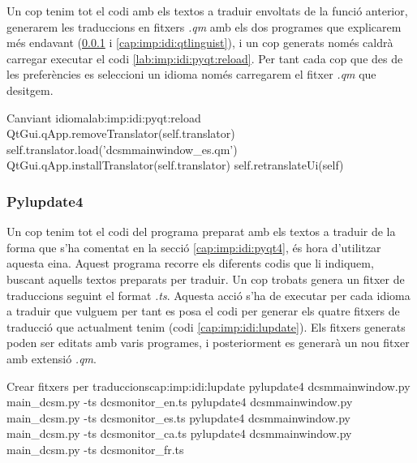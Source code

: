 Un cop tenim tot el codi amb els textos a traduir envoltats de la funció anterior, generarem les traduccions en fitxers \emph{.qm} amb els dos programes que explicarem més endavant (\Pylupdate \ref{cap:imp:idi:pylupdate4} i \Qtlinguist \ref{cap:imp:idi:qtlinguist}), i un cop generats només caldrà carregar executar el codi \ref{lab:imp:idi:pyqt:reload}.
Per tant cada cop que des de les preferències es seleccioni un idioma només carregarem el fitxer \emph{.qm} que desitgem.

\begin{code_python}{Canviant idioma}{lab:imp:idi:pyqt:reload}
QtGui.qApp.removeTranslator(self.translator)
self.translator.load('dcsmmainwindow_es.qm')
QtGui.qApp.installTranslator(self.translator)
self.retranslateUi(self)
\end{code_python}

\subsubsection{Pylupdate4}\label{cap:imp:idi:pylupdate4}

Un cop tenim tot el codi del programa \DCSMonitor preparat amb els textos a traduir de la forma que s'ha comentat en la secció \ref{cap:imp:idi:pyqt4}, és hora d'utilitzar aquesta eina.
Aquest programa recorre els diferents codis que li indiquem, buscant aquells textos preparats per traduir. Un cop trobats genera un fitxer de traduccions seguint el format \emph{.ts}.
Aquesta acció s'ha de executar per cada idioma a traduir que vulguem per tant es posa el codi per generar els quatre fitxers de traducció que actualment tenim (codi \ref{cap:imp:idi:lupdate}).
Els fitxers generats poden ser editats amb varis programes, i posteriorment es generarà un nou fitxer amb extensió \emph{.qm}.

\begin{code_bash}{Crear fitxers per traduccions}{cap:imp:idi:lupdate}
pylupdate4 dcsmmainwindow.py main_dcsm.py -ts dcsmonitor_en.ts
pylupdate4 dcsmmainwindow.py main_dcsm.py -ts dcsmonitor_es.ts
pylupdate4 dcsmmainwindow.py main_dcsm.py -ts dcsmonitor_ca.ts
pylupdate4 dcsmmainwindow.py main_dcsm.py -ts dcsmonitor_fr.ts
\end{code_bash}


